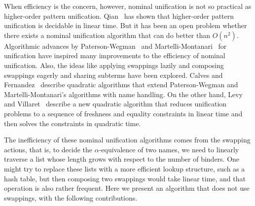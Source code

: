 \documentclass[a4paper,UKenglish]{lipics-v2016}
\begin{document}
When efficiency is the concern, however, nominal unification is not so practical as higher-order pattern unification.
Qian~\cite{qian_unification_1996} has shown that higher-order pattern unification is decidable in linear time.
But it has been an open problem
whether there exists a nominal unification algorithm
that can do better than $O(n^2)$.
Algorithmic advances by Paterson-Wegman~\cite{paterson_linear_1978} and Martelli-Montanari~\cite{martelli_efficient_1982} for unification
have inspired many improvements to the efficiency of nominal unification.
Also, the ideas like applying swappings lazily and composing swappings eagerly and sharing subterms have been explored.
Calves and Fernandez~\cite{calves_polynomial_2008, calves_complexity_2010, calves_first-order_2010}
describe quadratic
algorithms that extend Paterson-Wegman and Martelli-Montanari's
algorithms with name handling. On the other hand, Levy and
Villaret~\cite{levy_efficient_2010} describe a new quadratic algorithm
that reduces unification problems to a sequence of freshness and
equality constraints in linear time and then solves the constraints in quadratic time.

The inefficiency of these nominal unification algorithms
comes from the swapping actions, that is,
to decide the $\alpha$-equivalence of two names,
we need to linearly traverse a list
whose length grows with respect to the number of binders.
One might try to replace these lists with a more efficient lookup
structure, such as a hash table,
but then composing two swappings would take linear time,
and that operation is also rather frequent.
Here we present an algorithm that does not use swappings,
with the following contributions.
\end{document}
